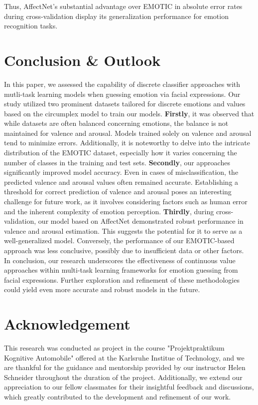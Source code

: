 \documentclass[conference]{IEEEtran}
\begin{document}
Thus, AffectNet's substantial advantage over EMOTIC in absolute error rates during cross-validation display its generalization performance for emotion recognition tasks.\\

\newpage
\section{Conclusion \& Outlook}

In this paper, we assessed the capability of discrete classifier approaches with mutli-task learning models when guessing emotion via facial expressions. 
Our study utilized two prominent datasets tailored for discrete emotions and values based on the circumplex model to train our models. \textbf{Firstly}, it was observed that while datasets are often balanced concerning emotions, the balance is not maintained for valence and arousal. Models trained solely on valence and arousal tend to minimize errors. Additionally, it is noteworthy to delve into the intricate distribution of the EMOTIC dataset, especially how it varies concerning the number of classes in the training and test sets. \textbf{Secondly}, our approaches significantly improved model accuracy. Even in cases of misclassification, the predicted valence and arousal values often remained accurate. Establishing a threshold for correct prediction of valence and arousal poses an interesting challenge for future work, as it involves considering factors such as human error and the inherent complexity of emotion perception. \textbf{Thirdly}, during cross-validation, our model based on AffectNet demonstrated robust performance in valence and arousal estimation. This suggests the potential for it to serve as a well-generalized model. Conversely, the performance of our EMOTIC-based approach was less conclusive, possibly due to insufficient data or other factors. \\

In conclusion, our research underscores the effectiveness of continuous value approaches within multi-task learning frameworks for emotion guessing from facial expressions. Further exploration and refinement of these methodologies could yield even more accurate and robust models in the future.

\section{Acknowledgement}
This research was conducted as project in the course "Projektpraktikum Kognitive Automobile" offered at the Karlsruhe Institue of Technology, and we are thankful for the guidance and mentorship provided by our instructor Helen Schneider throughout the duration of the project. Additionally, we extend our appreciation to our fellow classmates for their insightful feedback and discussions, which greatly contributed to the development and refinement of our work.



\end{document}
